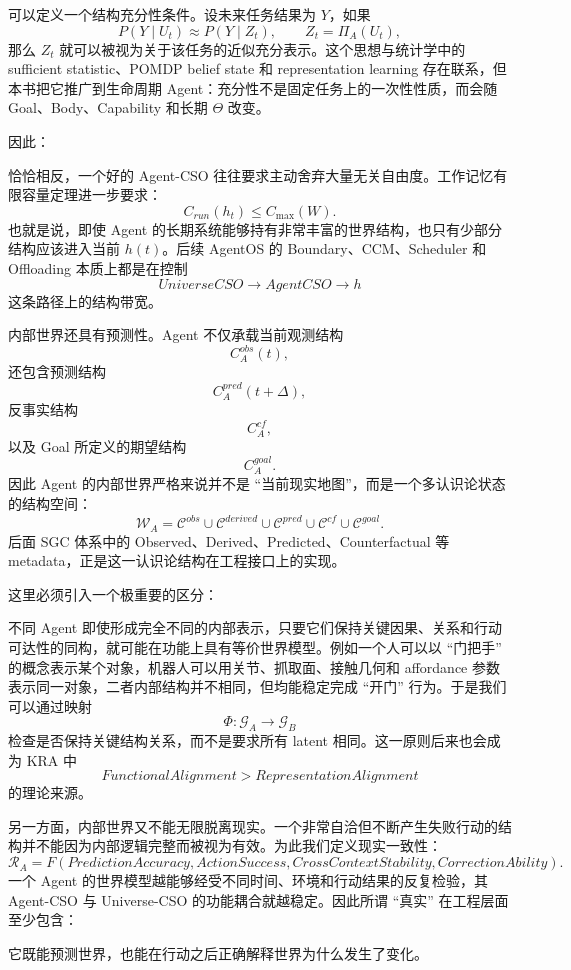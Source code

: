 可以定义一个结构充分性条件。设未来任务结果为 $Y$，如果
\[
P(Y\mid U_t)
\approx
P(Y\mid Z_t),
\qquad
Z_t=\Pi_A(U_t),
\]
那么 $Z_t$ 就可以被视为关于该任务的近似充分表示。这个思想与统计学中的 sufficient statistic、POMDP belief state 和 representation learning 存在联系，但本书把它推广到生命周期 Agent：充分性不是固定任务上的一次性性质，而会随 Goal、Body、Capability 和长期 $\Theta$ 改变。

因此：
\begin{statementbox}
\centering
{}
\end{statementbox}
恰恰相反，一个好的 Agent-CSO 往往要求主动舍弃大量无关自由度。工作记忆有限容量定理进一步要求：
\[
C_{run}(h_t)
\leq
C_{\max}(W).
\]
也就是说，即使 Agent 的长期系统能够持有非常丰富的世界结构，也只有少部分结构应该进入当前 $h(t)$。后续 AgentOS 的 Boundary、CCM、Scheduler 和 Offloading 本质上都是在控制
\[
UniverseCSO
\rightarrow
AgentCSO
\rightarrow
h
\]
这条路径上的结构带宽。

内部世界还具有预测性。Agent 不仅承载当前观测结构
\[
C_A^{obs}(t),
\]
还包含预测结构
\[
C_A^{pred}(t+\Delta),
\]
反事实结构
\[
C_A^{cf},
\]
以及 Goal 所定义的期望结构
\[
C_A^{goal}.
\]
因此 Agent 的内部世界严格来说并不是 ``当前现实地图''，而是一个多认识论状态的结构空间：
\[
\mathcal W_A
=
\mathcal C^{obs}
\cup
\mathcal C^{derived}
\cup
\mathcal C^{pred}
\cup
\mathcal C^{cf}
\cup
\mathcal C^{goal}.
\]
后面 SGC 体系中的 Observed、Derived、Predicted、Counterfactual 等 metadata，正是这一认识论结构在工程接口上的实现。

这里必须引入一个极重要的区分：
\begin{statementbox}
\centering
{}
\end{statementbox}
不同 Agent 即使形成完全不同的内部表示，只要它们保持关键因果、关系和行动可达性的同构，就可能在功能上具有等价世界模型。例如一个人可以以 ``门把手'' 的概念表示某个对象，机器人可以用关节、抓取面、接触几何和 affordance 参数表示同一对象，二者内部结构并不相同，但均能稳定完成 ``开门'' 行为。于是我们可以通过映射
\[
\Phi:
\mathcal G_A
\rightarrow
\mathcal G_B
\]
检查是否保持关键结构关系，而不是要求所有 latent 相同。这一原则后来也会成为 KRA 中
\[
FunctionalAlignment
>
RepresentationAlignment
\]
的理论来源。

另一方面，内部世界又不能无限脱离现实。一个非常自洽但不断产生失败行动的结构并不能因为内部逻辑完整而被视为有效。为此我们定义现实一致性：
\[
\mathcal R_A
=
F
\left(
PredictionAccuracy,
ActionSuccess,
CrossContextStability,
CorrectionAbility
\right).
\]
一个 Agent 的世界模型越能够经受不同时间、环境和行动结果的反复检验，其 Agent-CSO 与 Universe-CSO 的功能耦合就越稳定。因此所谓 ``真实'' 在工程层面至少包含：
\begin{statementbox}
\centering
{}
\end{statementbox}
它既能预测世界，也能在行动之后正确解释世界为什么发生了变化。

